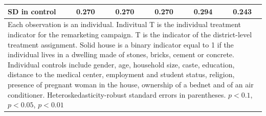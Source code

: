 {{\begin{tabular}{l*{5}{c}}
SD in control   &    0.270         &    0.270         &    0.270         &    0.294         &    0.243         \\
\hline\hline
\multicolumn{6}{p{0.85\linewidth}}{\scriptsize Each observation is an individual. Indivitual T is the individual treatment indicator for the remarketing campaign. T is the indicator of the district-level treatment assignment. Solid house is a binary indicator equal to 1 if the individual lives in a dwelling made of stones, bricks, cement or concrete. Individual controls include gender, age, household size, caste, education, distance to the medical center, employment and student status, religion, presence of pregnant woman in the house, ownership of a bednet and of an air conditioner. Heteroskedasticity-robust standard errors in parentheses. \sym{*} \(p<0.1\), \sym{**} \(p<0.05\), \sym{***} \(p<0.01\)}\\
\end{tabular}
}%

}
